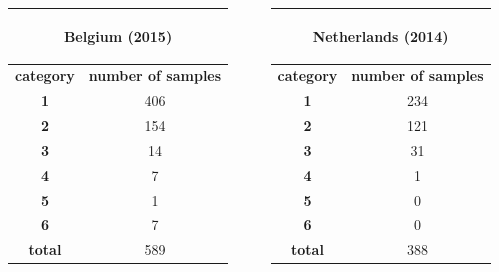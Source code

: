 \documentclass[c]{beamer}
\begin{document}
\begin{frame}
\begin{itemize}
{\begin{columns}
\begin{column}{0.33\textwidth}
\begin{table}
\begin{center}
   \begin{adjustbox}{max width=0.5\textwidth}
    \begin{tabular}{|c|c|}
      \hline
      \multicolumn{2}{|c|}{\begin{bf}Belgium (2015)\end{bf}} \\
      \hline
      \textbf{category} & \textbf{number of samples}\\
      \hline
      \textbf{1} & 406\\
      \hline
      \textbf{2} & 154\\
      \hline
      \textbf{3} & 14\\
      \hline
      \textbf{4} & 7\\
      \hline
      \textbf{5} & 1\\
      \hline
      \textbf{6} & 7\\
      \hline
      \textbf{total} & 589\\
      \hline
    \end{tabular}
   \end{adjustbox}
   \end{center}
   \end{table}
  \end{column}
  \begin{column}{0.33\textwidth}
   \begin{table}
   \begin{center}
   \begin{adjustbox}{max width=0.5\textwidth}
    \begin{tabular}{|c|c|}
      \hline
      \multicolumn{2}{|c|}{\begin{bf}Netherlands (2014)\end{bf}} \\
      \hline
      \textbf{category} & \textbf{number of samples}\\
      \hline
      \textbf{1} & 234\\
      \hline
      \textbf{2} & 121\\
      \hline
      \textbf{3} & 31\\
      \hline
      \textbf{4} & 1\\
      \hline
      \textbf{5} & 0\\
      \hline
      \textbf{6} & 0 \\
      \hline
      \textbf{total} & 388\\
      \hline
    \end{tabular}
   \end{adjustbox}

\end{center}
\end{table}
\end{column}
\end{columns}}
\end{itemize}
\end{frame}
\end{document}
